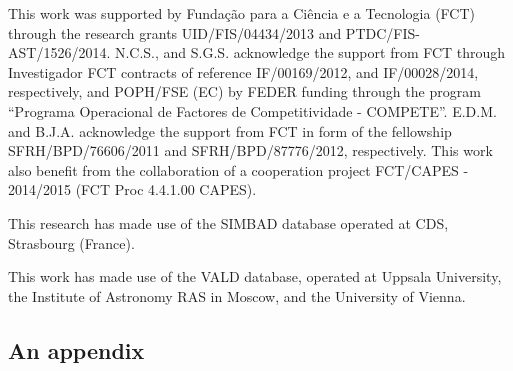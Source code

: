 \documentclass{aa}
\begin{document}
\begin{acknowledgements}

This work was supported by Funda\c{c}\~ao para a Ci\^encia e a
Tecnologia (FCT) through the research grants UID/FIS/04434/2013 and
PTDC/FIS-AST/1526/2014. N.C.S., and S.G.S. acknowledge the support from
FCT through Investigador FCT contracts of reference IF/00169/2012, and
IF/00028/2014, respectively, and POPH/FSE (EC) by FEDER funding through
the program “Programa Operacional de Factores de Competitividade
- COMPETE”. E.D.M. and B.J.A. acknowledge the support from FCT in
form of the fellowship SFRH/BPD/76606/2011 and SFRH/BPD/87776/2012,
respectively. This work also benefit from the collaboration of a
cooperation project FCT/CAPES - 2014/2015 (FCT Proc 4.4.1.00 CAPES).

This research has made use of the SIMBAD database operated at CDS,
Strasbourg (France).

This work has made use of the VALD database, operated at Uppsala
University, the Institute of Astronomy RAS in Moscow, and the University
of Vienna.

\end{acknowledgements}






\begin{appendix}
\section{An appendix}


\end{appendix}
\end{document}
